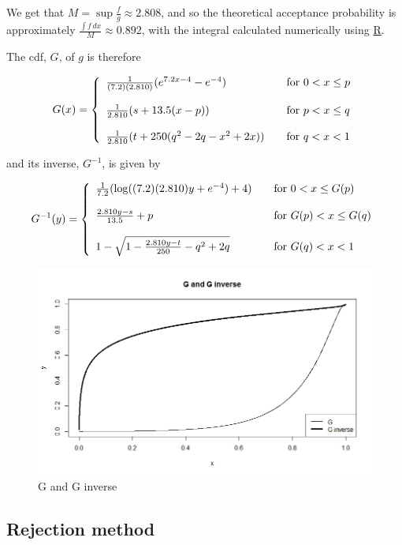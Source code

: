 \documentclass[11pt, a4paper]{article}
\begin{document}
We get that $M = \sup \frac{f}{g} \approx 2.808$, and so the theoretical acceptance probability is approximately $\frac{\int f \,dx}{M} \approx 0.892$, with the integral calculated numerically using \url{R}.

The cdf, $G$, of $g$ is therefore

\[ G(x) = \left\{ 
\begin{array}{l l}
\frac1{(7.2)(2.810)}(e^{7.2x-4}-e^{-4}) & \quad \text{for } 0 < x \leq p\\
\\
\frac1{2.810}(s + 13.5(x-p)) & \quad \text{for } p < x \leq q \\
\\
\frac1{2.810}(t + 250(q^2 - 2q - x^2 + 2x)) & \quad \text{for } q < x < 1
\end{array} \right.\]

and its inverse, $G^{-1}$, is given by

\[ G^{-1}(y) = \left\{ 
\begin{array}{l l}
\frac1{7.2}(\log((7.2)(2.810)y + e^{-4})+4 ) & \quad \text{for } 0 < x \leq G(p)\\
\\
\frac{2.810y - s}{13.5} + p & \quad \text{for } G(p) < x \leq G(q) \\
\\
1 - \sqrt{1 - \frac{2.810y - t}{250} - q^2 + 2q} & \quad \text{for } G(q) < x < 1
\end{array} \right.\]

\begin{figure}[H]
\centering
	\includegraphics[scale=0.4]{1G.jpeg}
\caption{G and G inverse}
\end{figure}

\subsection{Rejection method}
\end{document}
